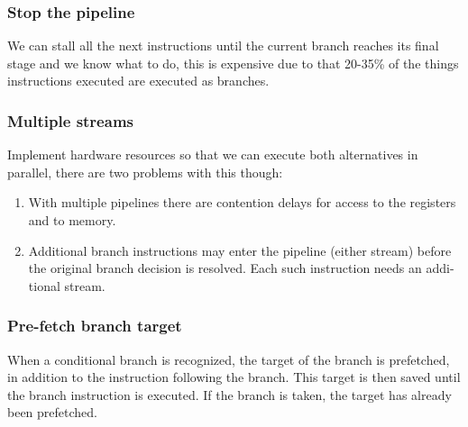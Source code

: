 \documentclass[titlepage, a4paper]{article}
\begin{document}
\subsubsection{Stop the pipeline}
We can stall all the next instructions until the current branch reaches its final stage and we know what to do, this is expensive due to that 20-35\% of the things instructions executed are executed as branches.

\subsubsection{Multiple streams}
Implement hardware resources so that we can execute both alternatives in parallel, there are two problems with this though:
\begin{enumerate}
\item With multiple pipelines there are contention delays for access to the registers and to memory. \\
\item Additional branch instructions may enter the pipeline (either stream) before the original branch decision is resolved. Each such instruction needs an addi- tional stream.
\end{enumerate}

\subsubsection{Pre-fetch branch target}
When a conditional branch is recognized, the target of the branch is prefetched, in addition to the instruction following the branch. This target is then saved until the branch instruction is executed. If the branch is taken, the target has already been prefetched.
\end{document}
